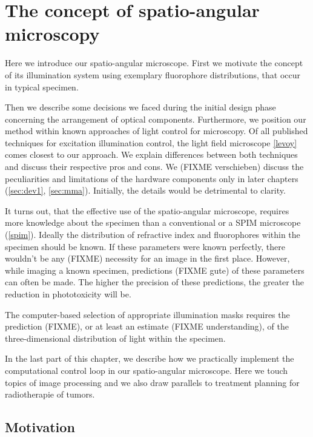 \chapter{The concept of spatio-angular microscopy}
\label{sec:concept}
\begin{summary}
  Here we introduce our spatio-angular microscope. First we motivate
  the concept of its illumination system using exemplary fluorophore
  distributions, that occur in typical specimen.

  Then we describe some decisions we faced during the initial design
  phase concerning the arrangement of optical components. Furthermore,
  we position our method within known approaches of light control for
  microscopy. Of all published techniques for excitation illumination
  control, the light field microscope \ref{levoy} comes closest to our
  approach.  We explain differences between both techniques and
  discuss their respective pros and cons.  We (FIXME verschieben)
  discuss the peculiarities and limitations of the hardware components
  only in later chapters (\ref{sec:dev1}, \ref{sec:mma}).  Initially,
  the details would be detrimental to clarity.

  It turns out, that the effective use of the spatio-angular
  microscope, requires more knowledge about the specimen than a
  conventional or a SPIM microscope (\ref{spim}). Ideally the
  distribution of refractive index and fluorophores within the
  specimen should be known. If these parameters were known perfectly,
  there wouldn't be any (FIXME) necessity for an image in the first
  place. However, while imaging a known specimen, predictions (FIXME
  gute) of these parameters can often be made. The higher the
  precision of these predictions, the greater the reduction in
  phototoxicity will be.

  The computer-based selection of appropriate illumination masks
  requires the prediction (FIXME), or at least an estimate (FIXME
  understanding), of the three-dimensional distribution of light within
  the specimen.

  In the last part of this chapter, we describe how we practically
  implement the computational control loop in our spatio-angular
  microscope. Here we touch topics of image processing and we also
  draw parallels to treatment planning for radiotherapie of tumors.
\end{summary}
\section{Motivation}


